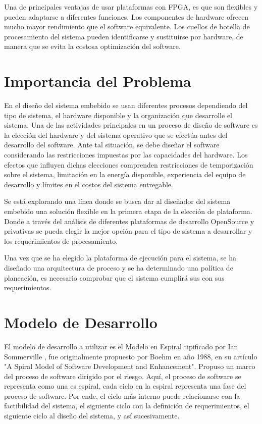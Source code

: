 Una de principales ventajas de usar plataformas con FPGA, es que son flexibles y pueden adaptarse a diferentes funciones. Los componentes de
hardware ofrecen mucho mayor rendimiento que el software equivalente. Los cuellos de botella de procesamiento del sistema pueden identificarse y
sustituirse por hardware, de manera que se evita la costosa optimización del software.

\section{Importancia del Problema}

En el diseño del sistema embebido se usan diferentes procesos dependiendo del tipo de sistema, el hardware disponible y la organización que
desarrolle el sistema. Una de las actividades principales en un proceso de diseño de software es la elección del hardware y del sistema operativo que
se efectúa antes del desarrollo del software. Ante tal situación, se debe diseñar el software considerando las restricciones impuestas por las
capacidades del hardware.
Los efectos que influyen dichas elecciones comprenden restricciones de temporización sobre el sistema, limitación en la energía disponible,
experiencia del equipo de desarrollo y límites en el costos del sistema entregable.
 
Se está explorando una línea donde se busca dar al diseñador del sistema embebido una solución flexible en la primera etapa de la elección de
plataforma. Donde a través del análisis de diferentes plataformas de desarrollo OpenSource y privativas se pueda elegir la mejor opción para el tipo
de sistema a desarrollar y los requerimientos de procesamiento.
 
Una vez que se ha elegido la plataforma de ejecución para el sistema, se ha diseñado una arquitectura de proceso y se ha determinado una política de
planeación, es necesario comprobar que el sistema cumplirá sus con sus requerimientos.

\section{Modelo de Desarrollo}

El modelo de desarrollo a utilizar es el Modelo en Espiral tipificado por Ian Sommerville\cite{Etiqueta00}%
, fue originalmente propuesto por Boehm en año 1988, en su artículo "A Spiral Model of Software Development and Enhancement". Propuso un
marco del proceso de software dirigido por el riesgo. Aquí, el proceso de software se representa como una es espiral, cada ciclo en la espiral
representa una fase del proceso de software. Por ende, el ciclo más interno puede relacionarse con la factibilidad del sistema, el siguiente ciclo
con la definición de requerimientos, el siguiente ciclo al diseño del sistema, y así sucesivamente. %

